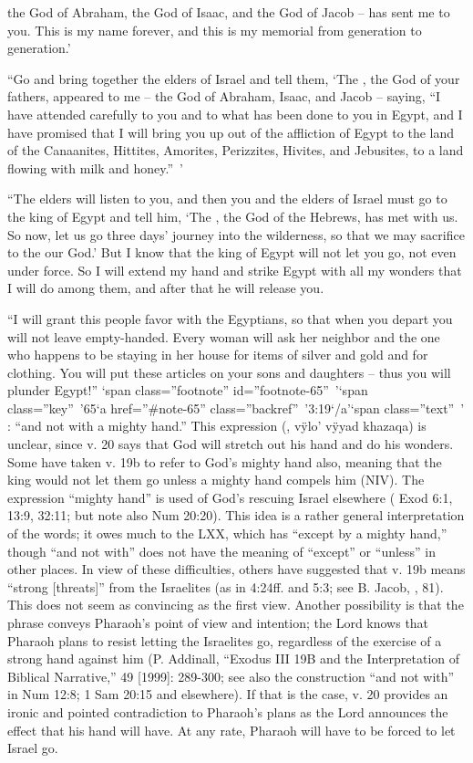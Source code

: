 {the God
of Abraham,
the God
of Isaac,
and the God
of Jacob
– has sent
me to
you. This
is my name
forever,
and this
is my memorial
from generation
to generation.’
\par }{\PP {}“Go
and bring together
the elders
of Israel
and tell
them, ‘The
{}, the God
of your fathers,
appeared
to me – the God of Abraham, Isaac, and Jacob – saying, “I have attended carefully to you and to what has been done to you in Egypt,
and I have promised that I will bring you up
out of the affliction
of Egypt
to
the land
of the Canaanites,
Hittites,
Amorites,
Perizzites,
Hivites,
and Jebusites,
to
a land
flowing
with milk
and honey.” ’
\par }{\PP {}“The elders will listen
to you, and then you
and the elders
of Israel
must go
to
the king
of Egypt
and tell
him, ‘The
{}, the God
of the Hebrews,
has met
with us. So now,
let
us go
three
days’
journey
into the wilderness,
so that we may sacrifice
to the
{}
our God.’
But I
know
that
the king
of Egypt
will not
let
you go,
not
even under force.
So I will extend
my hand
and strike
Egypt
with all
my wonders
that
I will do
among
them, and after
that
he will release
you.
\par }{\PP {}“I
will grant
this
people
favor
with the Egyptians,
so that when
you depart
you will not
leave
empty-handed.
Every woman
will ask
her neighbor
and the one who happens to be staying
in her house
for items
of silver
and gold
and for clothing.
You will put
these articles
on
your sons
and daughters
– thus you
will plunder Egypt!” ‘span class=”footnote” id=”footnote-65” ’‘span class=”key” ’65‘a href=”\#note-65” class=”backref” ’3:19‘/a’‘span class=”text” ’
{}:
{} “and not with a mighty hand.” This expression ({}, vÿlo’ vÿyad khazaqa) is unclear, since v.
20 says that God will stretch out his hand and do his wonders. Some have taken v.
19b to refer to God’s mighty hand also, meaning that the king would not let them go unless a mighty hand compels him (NIV). The expression “mighty hand” is used of God’s rescuing Israel elsewhere (
Exod 6:1, 13:9, 32:11; but note also
Num 20:20). This idea is a rather general interpretation of the words; it owes much to the LXX, which has “except by a mighty hand,” though “and not with” does not have the meaning of “except” or “unless” in other places. In view of these difficulties, others have suggested that v.
19b means “strong [threats]” from the Israelites (as in
4:24ff. and
5:3; see B. Jacob,
{}, 81). This does not seem as convincing as the first view. Another possibility is that the phrase conveys Pharaoh’s point of view and intention; the Lord knows that Pharaoh plans to resist letting the Israelites go, regardless of the exercise of a strong hand against him (P. Addinall, “Exodus III 19B and the Interpretation of Biblical Narrative,”
{} 49 [1999]: 289-300; see also the construction “and not with” in
Num 12:8;
1 Sam 20:15 and elsewhere). If that is the case, v.
20 provides an ironic and pointed contradiction to Pharaoh’s plans as the Lord announces the effect that his hand will have. At any rate, Pharaoh will have to be forced to let Israel go.

}
